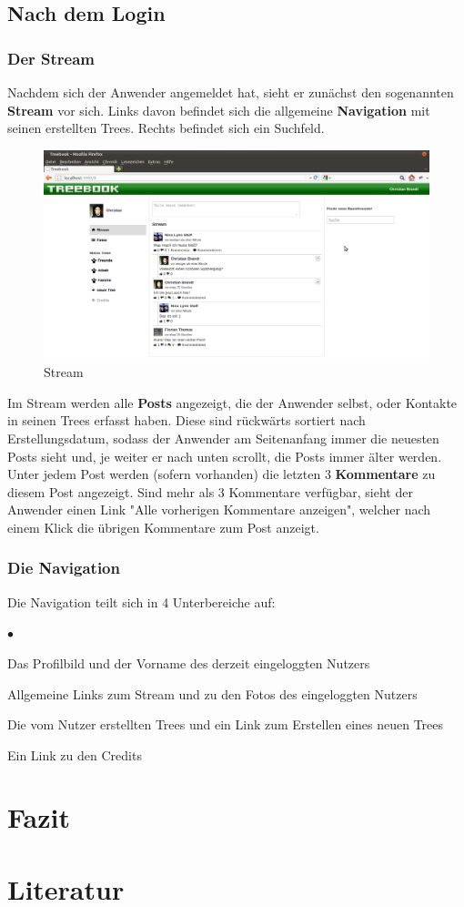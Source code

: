 \documentclass[10pt,a4paper]{book}
\makeatletter
\def\ScaleIfNeeded{%
\ifdim\Gin@nat@width>\linewidth
\linewidth
\else
\Gin@nat@width
\fi
}
\makeatother
\begin{document}
\section{Nach dem Login}
\subsection{Der Stream}
Nachdem sich der Anwender angemeldet hat, sieht er zunächst den sogenannten \textbf{Stream} vor sich. Links davon befindet sich die allgemeine \textbf{Navigation} mit seinen erstellten Trees. Rechts befindet sich ein Suchfeld.
\begin{figure}[htbp]
\centering
\includegraphics[width=\ScaleIfNeeded]{Pictures/screen_stream.png}%
\caption{Stream}%
\end{figure}
Im Stream werden alle \textbf{Posts} angezeigt, die der Anwender selbst, oder Kontakte in seinen Trees erfasst haben. Diese sind rückwärts sortiert nach Erstellungsdatum, sodass der Anwender am Seitenanfang immer die neuesten Posts sieht und, je weiter er nach unten scrollt, die Posts immer älter werden.
Unter jedem Post werden (sofern vorhanden) die letzten 3 \textbf{Kommentare} zu diesem Post angezeigt. Sind mehr als 3 Kommentare verfügbar, sieht der Anwender einen Link "Alle vorherigen Kommentare anzeigen", welcher nach einem Klick die übrigen Kommentare zum Post anzeigt.
\subsection{Die Navigation}
Die Navigation teilt sich in 4 Unterbereiche auf:
\begin{list}{$\bullet$}
\item Das Profilbild und der Vorname des derzeit eingeloggten Nutzers
\item Allgemeine Links zum Stream und zu den Fotos des eingeloggten Nutzers
\item Die vom Nutzer erstellten Trees und ein Link zum Erstellen eines neuen Trees
\item Ein Link zu den Credits
\end{list}

\chapter{Fazit}

\chapter{Literatur}
\end{document}
